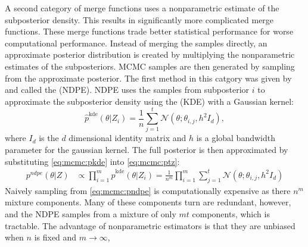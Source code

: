 \documentclass[thesis.tex]{subfiles}
\newcommand{\eye}[1]{I_{#1}}
\newcommand{\psup}[2]{\hat p^{#1}({#2})}
\newcommand{\pkde}[1]{\psup{\text{kde}}{#1}}
\newcommand{\pnp}[1]{\psup{\text{NWX,nonparametric}}{#1}}
\newcommand{\gaussian}[3]{\mathcal N({#1};{#2},{#3})}
\newcommand\sample[2]{\theta_{{#1},{#2}}}
\begin{document}
A second category of merge functions uses a nonparametric estimate of the subposterior density.
This results in significantly more complicated merge functions.
These merge functions trade better statistical performance for worse computational performance.
Instead of merging the samples directly,
an approximate posterior distribution is created by multiplying the nonparametric estimates of the subposteriors.
MCMC samples are then generated by sampling from the approximate posterior.
The first method in this catgory was given by \citet{neiswanger2014asymptotically} 
and called the  (NDPE).
NDPE uses the samples from subposterior $i$ to approximate the subposterior density using the  (KDE) with a Gaussian kernel:
\begin{equation}
    \label{eq:mcmc:pkde}
    \pkde{\theta|Z_i}
    =
    \frac{1}{n}\sum_{j=1}^t
    \gaussian{\theta}{\sample{i}{j}}{h^2 \eye d}
    ,
\end{equation}
where $\eye d$ is the $d$ dimensional identity matrix and $h$ is a global bandwidth parameter for the gaussian kernel.
The full posterior is then approximated by substituting \eqref{eq:mcmc:pkde} into \eqref{eq:mcmc:ptz}:
\begin{align}
    \label{eq:mcmc:pndpe}
    p^{ndpe}(\theta|Z)
    &\propto
    \prod_{i=1}^m \pkde{\theta|Z_i}
    =
    \frac{1}{n^m}
    \prod_{i=1}^m 
    \sum_{j=1}^t
    \gaussian{\theta}{\sample{i}{j}}{h^2 \eye d}
\end{align}
Naively sampling from \eqref{eq:mcmc:pndpe} is computationally expensive as there $n^m$ mixture components.
Many of these components turn are redundant, however, 
and the NDPE samples from a mixture of only $mt$ components,
which is tractable.
The advantage of nonparametric estimators is that they are unbiased when $n$ is fixed and $m\to\infty$,
\end{document}
